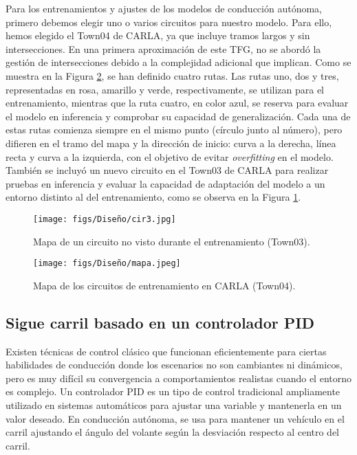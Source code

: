 Para los entrenamientos y ajustes de los modelos de conducción autónoma, primero debemos elegir uno o varios circuitos para nuestro modelo. Para ello, hemos elegido el Town04 de CARLA, ya que incluye tramos largos y sin intersecciones. En una primera aproximación de este \ac{TFG}, no se abordó la gestión de intersecciones debido a la complejidad adicional que implican. Como se muestra en la Figura \ref{fig:mapa}, se han definido cuatro rutas. Las rutas uno, dos y tres, representadas en rosa, amarillo y verde, respectivamente, se utilizan para el entrenamiento, mientras que la ruta cuatro, en color azul, se reserva para evaluar el modelo en inferencia y comprobar su capacidad de generalización. Cada una de estas rutas comienza siempre en el mismo punto (círculo junto al número), pero difieren en el tramo del mapa y la dirección de inicio: curva a la derecha, línea recta y curva a la izquierda, con el objetivo de evitar \textit{overfitting} en el modelo. También se incluyó un nuevo circuito en el Town03 de CARLA para realizar pruebas en inferencia y evaluar la capacidad de adaptación del modelo a un entorno distinto al del entrenamiento, como se observa en la Figura \ref{fig:cir3}.

\begin{figure}[ht]
\centering
\texttt{[image: figs/Diseño/cir3.jpg]}
\caption{Mapa de un circuito no visto durante el entrenamiento (Town03).}
\label{fig:cir3}
\end{figure}

\begin{figure}[ht]
  \centering
  \texttt{[image: figs/Diseño/mapa.jpeg]}
  \caption{Mapa de los circuitos de entrenamiento en CARLA (Town04).}
  \label{fig:mapa}
\end{figure}

\newpage

\subsection{Sigue carril basado en un controlador PID}

Existen técnicas de control clásico que funcionan eficientemente para ciertas habilidades de conducción donde los escenarios no son cambiantes ni dinámicos, pero es muy difícil su convergencia a comportamientos realistas cuando el entorno es complejo. Un controlador \ac{PID} es un tipo de control tradicional ampliamente utilizado en sistemas automáticos para ajustar una variable y mantenerla en un valor deseado. En conducción autónoma, se usa para mantener un vehículo en el carril ajustando el ángulo del volante según la desviación respecto al centro del carril.

